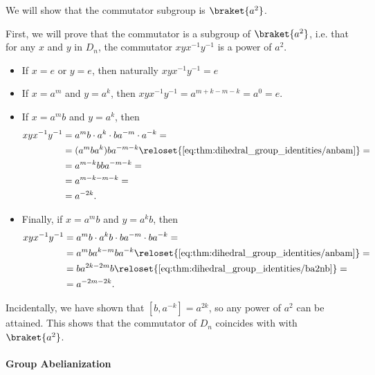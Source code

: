\begin{example}
\begin{thmenum}
    We will show that the commutator subgroup is \( \braket{ a^2 } \).

    First, we will prove that the commutator is a subgroup of \( \braket{ a^2 } \), i.e. that for any \( x \) and \( y \) in \( D_n \), the commutator \( xy x^{-1} y^{-1} \) is a power of \( a^2 \).

    \begin{itemize}
      \item If \( x = e \) or \( y = e \), then naturally \( xy x^{-1} y^{-1} = e \)
      \item If \( x = a^m \) and \( y = a^k \), then \( xy x^{-1} y^{-1} = a^{m+k-m-k} = a^0 = e \).
      \item If \( x = a^m b \) and \( y = a^k \), then
      \begin{align*}
        xyx^{-1} y^{-1}
        &=
        a^m b \cdot a^k \cdot b a^{-m} \cdot a^{-k}
        = \\ &=
        (a^m b a^k) b a^{-m-k}
        \reloset {\eqref{eq:thm:dihedral_group_identities/anbam}} = \\ &=
        a^{m-k} b b a^{-m-k}
        = \\ &=
        a^{m-k-m-k}
        = \\ &=
        a^{-2k}.
      \end{align*}

      \item Finally, if \( x = a^m b \) and \( y = a^k b \), then
      \begin{align*}
        xyx^{-1} y^{-1}
        &=
        a^m b \cdot a^k b \cdot b a^{-m} \cdot b a^{-k}
        = \\ &=
        a^m b a^{k-m} b a^{-k}
        \reloset {\eqref{eq:thm:dihedral_group_identities/anbam}} = \\ &=
        b a^{2k-2m} b
        \reloset {\eqref{eq:thm:dihedral_group_identities/ba2nb}} = \\ &=
        a^{-2m-2k}.
      \end{align*}
    \end{itemize}

    Incidentally, we have shown that \( [b, a^{-k}] = a^{2k} \), so any power of \( a^2 \) can be attained. This shows that the commutator of \( D_n \) coincides with with \( \braket{ a^2 } \).
  \end{thmenum}
\end{example}

\paragraph{Group Abelianization}

